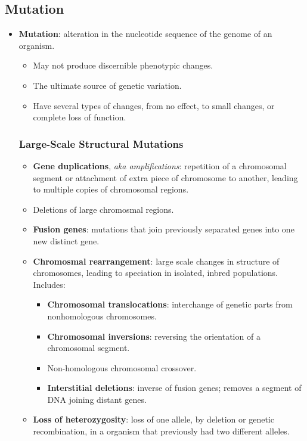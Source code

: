 \documentclass[12pt,a4paper]{article}
\begin{document}
\subsection{Mutation}
\begin{itemize}
    \item \textbf{Mutation}: alteration in the nucleotide sequence of the genome of an organism.
        \begin{itemize}
            \item May not produce discernible phenotypic changes.
            \item The ultimate source of genetic variation.
            \item Have several types of changes, from no effect, to small changes, or complete loss of function.
        \end{itemize}
    \subsubsection{Large-Scale Structural Mutations}
    \begin{itemize}
        \item \textbf{Gene duplications}, \textit{aka amplifications}: repetition of a chromosomal segment or attachment of extra piece of chromosome to another, leading to multiple copies of chromosomal regions.
        \item Deletions of large chromosmal regions.
        \item \textbf{Fusion genes}: mutations that join previously separated genes into one new distinct gene.
        \item \textbf{Chromosmal rearrangement}: large scale changes in structure of chromosomes, leading to speciation in isolated, inbred populations. Includes:
            \begin{itemize}
                \item \textbf{Chromosomal translocations}: interchange of genetic parts from nonhomologous chromosomes.
                \item \textbf{Chromosomal inversions}: reversing the orientation of a chromosomal segment.
                \item Non-homologous chromosomal crossover.
                \item \textbf{Interstitial deletions}: inverse of fusion genes; removes a segment of DNA joining distant genes.
            \end{itemize}
        \item \textbf{Loss of heterozygosity}: loss of one allele, by deletion or genetic recombination, in a organism that previously had two different alleles. 
    \end{itemize}

\end{itemize}
\end{document}
